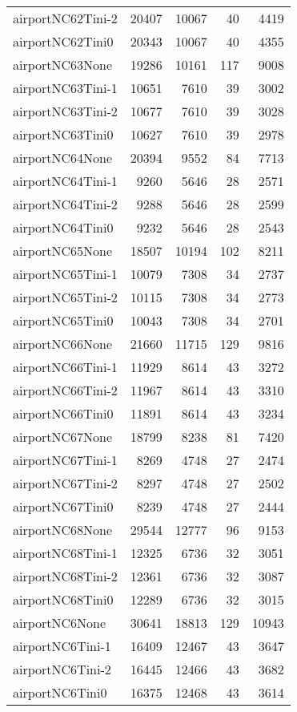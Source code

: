 \begin{longtable}{lrrrr}
airportNC62Tini-2 & 20407 & 10067 & 40 & 4419 \\
airportNC62Tini0 & 20343 & 10067 & 40 & 4355 \\
airportNC63None & 19286 & 10161 & 117 & 9008 \\
airportNC63Tini-1 & 10651 & 7610 & 39 & 3002 \\
airportNC63Tini-2 & 10677 & 7610 & 39 & 3028 \\
airportNC63Tini0 & 10627 & 7610 & 39 & 2978 \\
airportNC64None & 20394 & 9552 & 84 & 7713 \\
airportNC64Tini-1 & 9260 & 5646 & 28 & 2571 \\
airportNC64Tini-2 & 9288 & 5646 & 28 & 2599 \\
airportNC64Tini0 & 9232 & 5646 & 28 & 2543 \\
airportNC65None & 18507 & 10194 & 102 & 8211 \\
airportNC65Tini-1 & 10079 & 7308 & 34 & 2737 \\
airportNC65Tini-2 & 10115 & 7308 & 34 & 2773 \\
airportNC65Tini0 & 10043 & 7308 & 34 & 2701 \\
airportNC66None & 21660 & 11715 & 129 & 9816 \\
airportNC66Tini-1 & 11929 & 8614 & 43 & 3272 \\
airportNC66Tini-2 & 11967 & 8614 & 43 & 3310 \\
airportNC66Tini0 & 11891 & 8614 & 43 & 3234 \\
airportNC67None & 18799 & 8238 & 81 & 7420 \\
airportNC67Tini-1 & 8269 & 4748 & 27 & 2474 \\
airportNC67Tini-2 & 8297 & 4748 & 27 & 2502 \\
airportNC67Tini0 & 8239 & 4748 & 27 & 2444 \\
airportNC68None & 29544 & 12777 & 96 & 9153 \\
airportNC68Tini-1 & 12325 & 6736 & 32 & 3051 \\
airportNC68Tini-2 & 12361 & 6736 & 32 & 3087 \\
airportNC68Tini0 & 12289 & 6736 & 32 & 3015 \\
airportNC6None & 30641 & 18813 & 129 & 10943 \\
airportNC6Tini-1 & 16409 & 12467 & 43 & 3647 \\
airportNC6Tini-2 & 16445 & 12466 & 43 & 3682 \\
airportNC6Tini0 & 16375 & 12468 & 43 & 3614 \\

\end{longtable}
